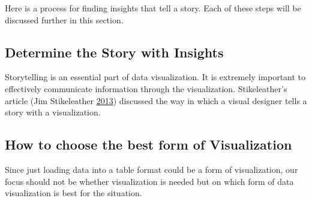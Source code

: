 \documentclass[]{book}
\begin{document}
Here is a process for finding insights that tell a story. Each of these
steps will be discussed further in this section.

\subsection{Determine the Story with
Insights}\label{determine-the-story-with-insights}

Storytelling is an essential part of data visualization. It is extremely
important to effectively communicate information through the
visualization. Stikeleather's article (Jim Stikeleather
\protect\hyperlink{ref-storytelling_with_data}{2013}) discussed the way
in which a visual designer tells a story with a visualization.

\subsection{How to choose the best form of
Visualization}\label{how-to-choose-the-best-form-of-visualization}

Since just loading data into a table format could be a form of
visualization, our focus should not be whether visualization is needed
but on which form of data visualization is best for the situation.
\end{document}
